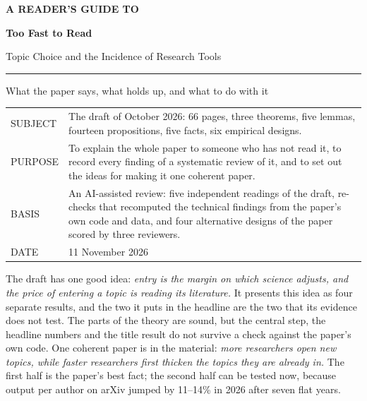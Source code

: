 \thispagestyle{empty}
\vspace*{0.9in}
{\sffamily\bfseries\large\color{hblue}A READER'S GUIDE TO\par}
\vspace{6pt}
{\sffamily\bfseries\fontsize{34}{38}\selectfont\color{hbluedark}Too Fast to Read\par}
\vspace{8pt}
{\sffamily\Large\color{inktwo}Topic Choice and the Incidence of Research Tools\par}
\vspace{18pt}
{\color{hblue}\hrule height 1.4pt}
\vspace{18pt}
{\Large What the paper says, what holds up, and what to do with it\par}
\vspace{0.5in}

\begin{tabularx}{\textwidth}{@{}P{1.25in}L@{}}
\textsf{\small\color{muted}SUBJECT} & The draft of October 2026: 66 pages, three theorems, five lemmas, fourteen propositions, five facts, six empirical designs. \\[3pt]
\textsf{\small\color{muted}PURPOSE} & To explain the whole paper to someone who has not read it, to record every finding of a systematic review of it, and to set out the ideas for making it one coherent paper. \\[3pt]
\textsf{\small\color{muted}BASIS} & An AI-assisted review: five independent readings of the draft, re-checks that recomputed the technical findings from the paper's own code and data, and four alternative designs of the paper scored by three reviewers. \\[3pt]
\textsf{\small\color{muted}DATE} & 11 November 2026 \\
\end{tabularx}

\vfill
\begin{keybox}
The draft has one good idea: \emph{entry is the margin on which science adjusts, and the price of entering a topic is reading its literature.}
It presents this idea as four separate results, and the two it puts in the headline are the two that its evidence does not test.
The parts of the theory are sound, but the central step, the headline numbers and the title result do not survive a check against the paper's own code.
One coherent paper is in the material: \emph{more researchers open new topics, while faster researchers first thicken the topics they are already in.}
The first half is the paper's best fact; the second half can be tested now, because output per author on arXiv jumped by 11--14\% in 2026 after seven flat years.
\end{keybox}
\vspace{0.3in}
\clearpage

